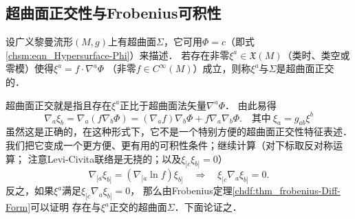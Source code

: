\subsection{超曲面正交性与Frobenius可积性}\label{chsm:sec_hypersurface-orthogonal}


\begin{definition}\label{chsm:def_hypersurface-orthogonal}
    设广义黎曼流形$(M,g)$上有超曲面$\Sigma$，它可用$\Phi=c$（即式\eqref{chsm:eqn_Hypersurface-Phi}）来描述．
    若存在非零$\xi^a \in \mathfrak{X}(M)$（类时、类空或零模）使得$\xi^a= f\cdot \nabla^a\Phi$
    （非零$f\in C^\infty(M)$）成立，则称$\xi^a$与$\Sigma$是{\heiti 超曲面正交}的．
\end{definition}

超曲面正交就是指且存在$\xi^a$正比于超曲面法矢量$\nabla^a\Phi$．
由此易得
\begin{equation}
    \nabla_{a} \xi_{b} = \nabla_{a} (f \nabla_{b} \Phi)
      = (\nabla_{a} f) \nabla_{b} \Phi + f \nabla_{a}  \nabla_{b} \Phi .
      \quad \text{其中}\ \xi_a = g_{ab}\xi^b
\end{equation}
虽然这是正确的，在这种形式下，它不是一个特别方便的超曲面正交性特征表述．
我们把它变成一个更方便、更有用的可积性条件；继续计算（对下标取反对称运算；
注意Levi-Civita联络是无挠的；以及$\xi_{[c} \xi_{b]}=0$）
\begin{equation}
    \nabla_{[a} \xi_{b]} = (\nabla_{[a} \ln f) \xi_{b]} \quad   \Rightarrow \quad
    \xi_{[c}\nabla_{a} \xi_{b]} = 0.
\end{equation}
反之，如果$\xi^a$满足$\xi_{[c}\nabla_{a} \xi_{b]} = 0$，
那么由Frobenius定理\ref{chdf:thm_frobenius-Diff-Form}可以证明
存在与$\xi^a$正交的超曲面$\Sigma$．下面论证之．

